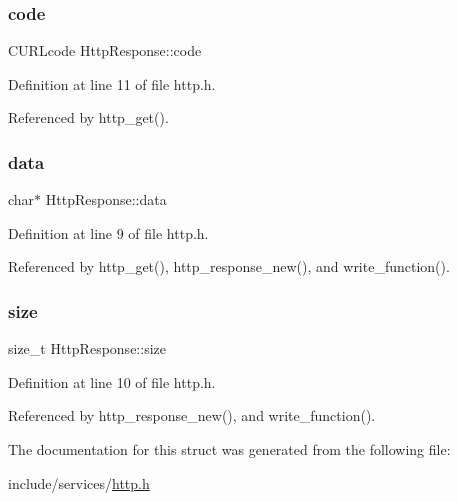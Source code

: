 \subsubsection{\texorpdfstring{code}{code}}
{\footnotesize\ttfamily C\+U\+R\+Lcode Http\+Response\+::code}



Definition at line 11 of file http.\+h.



Referenced by http\+\_\+get().

\mbox{\label{struct_http_response_a29b7ecfb11da1af6c7fdd3fe7862901f}} 
\subsubsection{\texorpdfstring{data}{data}}
{\footnotesize\ttfamily char$\ast$ Http\+Response\+::data}



Definition at line 9 of file http.\+h.



Referenced by http\+\_\+get(), http\+\_\+response\+\_\+new(), and write\+\_\+function().

\mbox{\label{struct_http_response_a11b910682b365528a15fcfd6d4dd824f}} 
\subsubsection{\texorpdfstring{size}{size}}
{\footnotesize\ttfamily size\+\_\+t Http\+Response\+::size}



Definition at line 10 of file http.\+h.



Referenced by http\+\_\+response\+\_\+new(), and write\+\_\+function().



The documentation for this struct was generated from the following file\+:\begin{DoxyCompactItemize}
\item 
include/services/\mbox{\hyperlink{http_8h}{http.\+h}}\end{DoxyCompactItemize}

